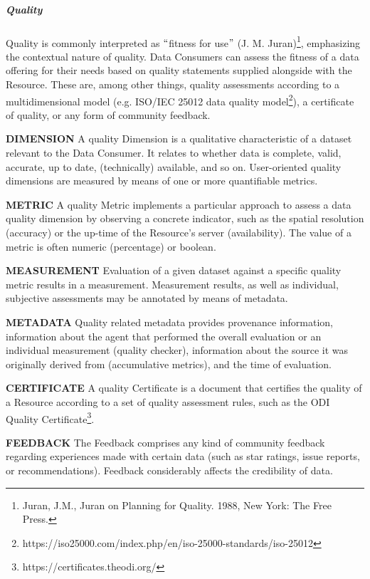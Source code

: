 

\subparagraph*{Quality}
Quality is commonly interpreted as $``$fitness for use$"$  (J. M. Juran)\footnote{Juran, J.M., Juran on Planning for Quality. 1988, New York: The Free Press.  }, emphasizing the contextual nature of quality. Data Consumers can assess the fitness of a data offering for their needs based on quality statements supplied alongside with the Resource. These are, among other things, quality assessments according to a multidimensional model (e.g. ISO/IEC 25012 data quality model\footnote{https://iso25000.com/index.php/en/iso-25000-standards/iso-25012 }), a certificate of quality, or any form of community feedback.


\textbf{DIMENSION} A quality Dimension is a qualitative characteristic of a dataset relevant to the Data Consumer. It relates to whether data is complete, valid, accurate, up to date, (technically) available, and so on. User-oriented quality dimensions are measured by means of one or more quantifiable metrics. 

\textbf{METRIC} A quality Metric implements a particular approach to assess a data quality dimension by observing a concrete indicator, such as the spatial resolution (accuracy) or the up-time of the Resource’s server (availability). The value of a metric is often numeric (percentage) or boolean. 

\textbf{MEASUREMENT} Evaluation of a given dataset against a specific quality metric results in a measurement. Measurement results, as well as individual, subjective assessments may be annotated by means of metadata. 

\textbf{METADATA} Quality related metadata provides provenance information, information about the agent that performed the overall evaluation or an individual measurement (quality checker), information about the source it was originally derived from (accumulative metrics), and the time of evaluation.

\textbf{CERTIFICATE} A quality Certificate is a document that certifies the quality of a Resource according to a set of quality assessment rules, such as the ODI Quality Certificate\footnote{https://certificates.theodi.org/ }. 

\textbf{FEEDBACK }The Feedback comprises any kind of community feedback regarding experiences made with certain data (such as star ratings, issue reports, or recommendations). Feedback considerably affects the credibility of data.



